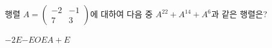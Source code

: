\hspace*{2mm}\begin{minipage}[t]{\dimexpr\linewidth-2mm\relax}\vspace{0pt}
행렬 $A=\begin{pmatrix} -2 & -1 \\ 7 & 3 \end{pmatrix}$에 대하여 다음 중 $A^{22}+A^{14}+A^6$과 같은 행렬은? 
\begin{choices32}{$-2E$}{$-E$}{$O$}{$E$}{$A+E$}\end{choices32}\end{minipage}
